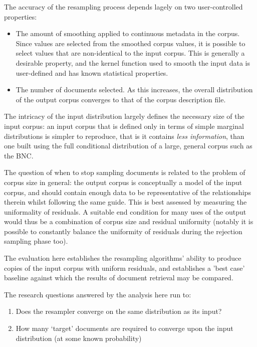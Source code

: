 
The accuracy of the resampling process depends lagely on two user-controlled properties:

\begin{itemize}
    \item The amount of smoothing applied to continuous metadata in the corpus.  Since values are selected from the smoothed corpus values, it is possible to select values that are non-identical to the input corpus.  This is generally a desirable property, and the kernel function used to smooth the input data is user-defined and has known statistical properties.
    \item The number of documents selected.  As this increases, the overall distribution of the output corpus converges to that of the corpus description file.
\end{itemize}


The intricacy of the input distribution largely defines the necessary size of the input corpus: an input corpus that is defined only in terms of simple marginal distributions is simpler to reproduce, that is it contains \textit{less information}, than one built using the full conditional distribution of a large, general corpus such as the BNC.

The question of when to stop sampling documents is related to the problem of corpus size in general: the output corpus is conceptually a model of the input corpus, and should contain enough data to be representative of the relationships therein whilst following the same guide.  This is best assessed by measuring the uniformality of residuals.  A suitable end condition for many uses of the output would thus be a combination of corpus size and residual uniformity (notably it is possible to constantly balance the uniformity of residuals during the rejection sampling phase too).

The evaluation here establishes the resampling algorithms' ability to produce copies of the input corpus with uniform residuals, and establishes a 'best case' baseline against which the results of document retrieval may be compared.

The research questions answered by the analysis here run to:

\begin{enumerate}
    \item Does the resampler converge on the same distribution as its input?
    \item How many `target' documents are required to converge upon the input distribution (at some known probability)
\end{enumerate}


